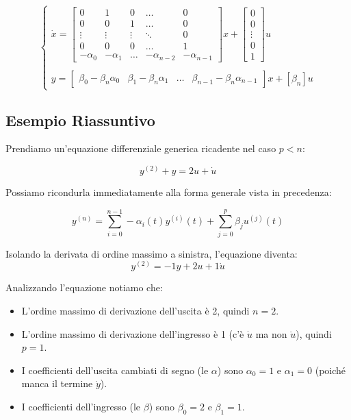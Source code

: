 \documentclass[a4paper,12pt]{article}
\begin{document}
	\[
	\begin{cases}
		\dot{x} = 
		\begin{bmatrix} 
			0 & 1 & 0 & \dots & 0 \\ 
			0 & 0 & 1 & \dots & 0 \\ 
			\vdots & \vdots & \vdots & \ddots & 0 \\ 
			0 & 0 & 0 & \dots & 1 \\ 
			-\alpha_0 & -\alpha_1 & \dots & -\alpha_{n-2} & -\alpha_{n-1} 
		\end{bmatrix} 
		x + 
		\begin{bmatrix} 
			0 \\ 
			0 \\ 
			\vdots \\ 
			0 \\ 
			1 
		\end{bmatrix} 
		u 
		\\
		\\
		y = 
		\begin{bmatrix} 
			\beta_0 - \beta_n\alpha_0 & \beta_1 - \beta_n\alpha_1 & \dots & \beta_{n-1} - \beta_n\alpha_{n-1} 
		\end{bmatrix} 
		x + [\beta_n] u
	\end{cases}
	\]
	
	\vspace{0.8cm}
	
	\subsection*{Esempio Riassuntivo}
	
	Prendiamo un'equazione differenziale generica ricadente nel caso $p < n$:
	
	\[
	y^{(2)} + y = 2u + \dot{u}
	\]
	
	Possiamo ricondurla immediatamente alla forma generale vista in precedenza:
	
	\[
	y^{(n)} = \sum_{i=0}^{n-1} -\alpha_i(t)y^{(i)}(t) + \sum_{j=0}^{p} \beta_j u^{(j)}(t)
	\]
	
	Isolando la derivata di ordine massimo a sinistra, l'equazione diventa:
	\[
	y^{(2)} = -1y + 2u + 1\dot{u}
	\]
	
	Analizzando l'equazione notiamo che:
	\begin{itemize}
		\item L'ordine massimo di derivazione dell'uscita è 2, quindi $n = 2$.
		\item L'ordine massimo di derivazione dell'ingresso è 1 (c'è $\dot{u}$ ma non $\ddot{u}$), quindi $p = 1$.
		\item I coefficienti dell'uscita cambiati di segno (le $\alpha$) sono $\alpha_0 = 1$ e $\alpha_1 = 0$ (poiché manca il termine $\dot{y}$).
		\item I coefficienti dell'ingresso (le $\beta$) sono $\beta_0 = 2$ e $\beta_1 = 1$.
	\end{itemize}
	
\end{document}

